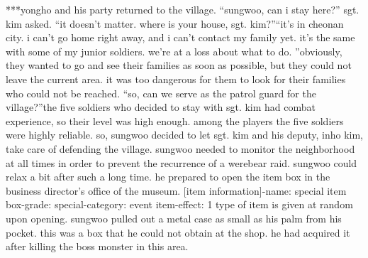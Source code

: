 ***yongho and his party returned to the village.
“sungwoo, can i stay here?” sgt.
 kim asked.
“it doesn’t matter.
 where is your house, sgt.
 kim?”“it’s in cheonan city.
 i can’t go home right away, and i can’t contact my family yet.
 it’s the same with some of my junior soldiers.
 we’re at a loss about what to do.
”obviously, they wanted to go and see their families as soon as possible, but they could not leave the current area.
 it was too dangerous for them to look for their families who could not be reached.
“so, can we serve as the patrol guard for the village?”the five soldiers who decided to stay with sgt.
 kim had combat experience, so their level was high enough.
 among the players the five soldiers were highly reliable.
 so, sungwoo decided to let sgt.
 kim and his deputy, inho kim, take care of defending the village.
sungwoo needed to monitor the neighborhood at all times in order to prevent the recurrence of a werebear raid.
sungwoo could relax a bit after such a long time.
 he prepared to open the item box in the business director’s office of the museum.
[item information]-name: special item box-grade: special-category: event item-effect: 1 type of item is given at random upon opening.
sungwoo pulled out a metal case as small as his palm from his pocket.
 this was a box that he could not obtain at the shop.
 he had acquired it after killing the boss monster in this area.

